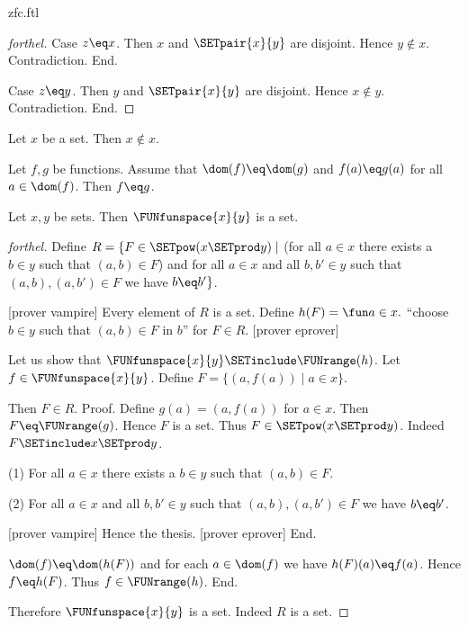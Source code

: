 \documentclass{naproche-library}
\begin{document}
\begin{smodule}[title=ZFC]{zfc.ftl}
\begin{proof}[forthel]
  Case $z \eq x$.
    Then $x$ and $\SETpair{x}{y}$ are disjoint.
    Hence $y \notin x$.
    Contradiction.
  End.

  Case $z \eq y$.
    Then $y$ and $\SETpair{x}{y}$ are disjoint.
    Hence $x \notin y$.
    Contradiction.
  End.
\end{proof}

\begin{corollary}[forthel,id=FOUNDATIONS_10_3086917813927936]
  Let $x$ be a set.
  Then $x \notin x$.
\end{corollary}

\begin{proposition}[forthel,id=FOUNDATIONS_10_4589652321021547]
  Let $f, g$ be functions.
  Assume that $\dom(f) \eq \dom(g)$ and $f(a) \eq g(a)$ for all $a \in \dom(f)$.
  Then $f \eq g$.
\end{proposition}

\begin{proposition}[forthel,id=FOUNDATIONS_10_4105036244189184]
  Let $x, y$ be sets.
  Then $\FUNfunspace{x}{y}$ is a set.
\end{proposition}
\begin{proof}[forthel]
  Define $R = \{ F \in \SETpow(x \SETprod y) \mid$ (for all $a \in x$ there exists a $b \in y$ such that $(a,b) \in F$) and for all $a \in x$ and all $b, b' \in y$ such that $(a,b), (a,b') \in F$ we have $b \eq b' \}$.

  [prover vampire]
  Every element of $R$ is a set. %
  Define $h(F) = \fun a \in x.$ ``choose $b \in y$ such that $(a,b) \in F$ in $b$'' for $F \in R$.
  [prover eprover]

  Let us show that $\FUNfunspace{x}{y} \SETinclude \FUNrange(h)$.
    Let $f \in \FUNfunspace{x}{y}$.
    Define $F = \{ (a,f(a)) \mid a \in x \}$.

    Then $F \in R$. \newline
    Proof.
      Define $g(a) = (a,f(a))$ for $a \in x$.
      Then $F \eq \FUNrange(g)$.
      Hence $F$ is a set.
      Thus $F \in \SETpow(x \SETprod y)$.
      Indeed $F \SETinclude x \SETprod y$.

      (1) For all $a \in x$ there exists a $b \in y$ such that $(a,b) \in F$.

      (2) For all $a \in x$ and all $b, b' \in y$ such that $(a,b),
      (a,b') \in F$ we have $b \eq b'$.

      [prover vampire]
      Hence the thesis.
      [prover eprover]
    End.

    $\dom(f) \eq \dom(h(F))$ and for each $a \in \dom(f)$ we have $h(F)(a) \eq f(a)$.
    Hence $f \eq h(F)$.
    Thus $f \in \FUNrange(h)$.
  End.

  Therefore $\FUNfunspace{x}{y}$ is a set.
  Indeed $R$ is a set.
\end{proof}
\end{smodule}
\end{document}
